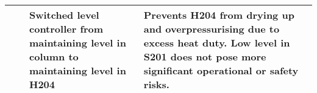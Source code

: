 {\begin{tabular}{@{}l>{\raggedright}p{2cm}p{7cm}p{10cm}@{}}
    &                           &      Switched level controller from maintaining level in column to maintaining level in H204                                                                                                                                                          &            Prevents H204 from drying up and overpressurising due to excess heat duty. Low level in S201 does not pose more significant operational or safety risks.                                                                                                                                                                                                                                  \\ \bottomrule
\end{tabular}%
}
    